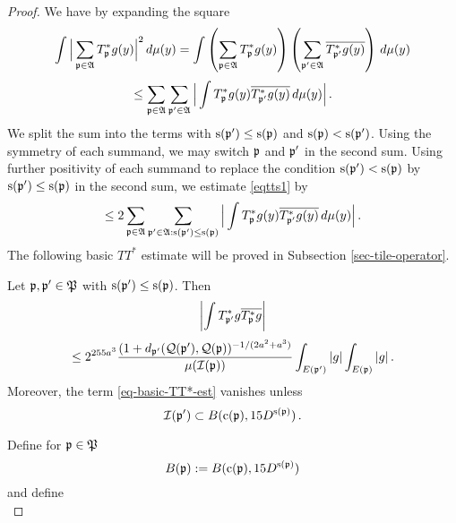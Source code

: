 {\begin{proof}
 We have by expanding the square
\begin{equation}
    \int \Big|\sum_{{\mathfrak p}\in \mathfrak{A}}T^*_{{\mathfrak p}}g(y)\Big|^2\, d\mu(y)=
    \int \left(\sum_{{\mathfrak p}\in \mathfrak{A}} T^*_{{\mathfrak p}}g(y)\right)
    \left(\sum_{{\mathfrak p}'\in \mathfrak{A}}\overline{T^*_{{\mathfrak p}'}g(y)}\right)\, d\mu(y)
\end{equation}\label{eqtts1}
\begin{equation}
    \le \sum_{{\mathfrak p}\in \mathfrak{A}} \sum_{{\mathfrak p}'\in \mathfrak{A}}
    \Big|\int T^*_{{\mathfrak p}}g(y)\overline{T^*_{{\mathfrak p}'}g(y)}\, d\mu(y)\Big|\,.
\end{equation}
We split the sum into the terms with ${\mathrm{s}}({\mathfrak p}')\le {\mathrm{s}}({\mathfrak p})$
and ${\mathrm{s}}({\mathfrak p})< {\mathrm{s}}({\mathfrak p}')$. Using the symmetry of each summand,
we may switch ${\mathfrak p}$ and ${\mathfrak p}'$ in the second sum. Using further positivity
of each summand to replace the condition ${\mathrm{s}}({\mathfrak p}')< {\mathrm{s}}({\mathfrak p})$
by ${\mathrm{s}}({\mathfrak p}')\le  {\mathrm{s}}({\mathfrak p})$ in the second sum, we estimate \eqref{eqtts1} by
\begin{equation}\label{eqtts2}
    \le2 \sum_{{\mathfrak p}\in \mathfrak{A}} \sum_{{\mathfrak p}'\in \mathfrak{A}: {\mathrm{s}}({\mathfrak p}')\le {\mathrm{s}}({\mathfrak p})}
    \Big|\int T^*_{{\mathfrak p}}g(y)\overline{T^*_{{\mathfrak p}'}g(y)}\, d\mu(y)\Big|\,.
\end{equation}
The following basic $TT^*$ estimate will be proved in Subsection \ref{sec-tile-operator}.
\begin{lemma}
    \label{tile-correlation}
    Let ${\mathfrak p}, {\mathfrak p}'\in {\mathfrak P}$ with
    ${\mathrm{s}}({{\mathfrak p}'})\leq {\mathrm{s}}({{\mathfrak p}})$.
    Then
    \begin{equation}
        \label{eq-basic-TT*-est}
        \left|\int T^*_{{\mathfrak p}'}g\overline{T^*_{{\mathfrak p}}g}\right|
    \end{equation}
    \begin{equation}
        \le 2^{255a^3}\frac{(1+d_{{\mathfrak p}'}({\mathcal{Q}}({\mathfrak p}'), {\mathcal{Q}}({\mathfrak p}))^{-1/(2a^2+a^3)}}{\mu({\mathcal{I}}({\mathfrak p}))}\int_{E({\mathfrak p}')}|g|\int_{E({\mathfrak p})}|g|\,.
    \end{equation}
    Moreover, the term   \eqref{eq-basic-TT*-est} vanishes unless
    \begin{equation}
        {\mathcal{I}}({\mathfrak p}') \subset B({\mathrm{c}}({\mathfrak p}), 15D^{{\mathrm{s}}({\mathfrak p})})\, .
    \end{equation}
\end{lemma}
Define for ${\mathfrak p}\in {\mathfrak P}$
\begin{equation}
    B({\mathfrak p}):=B({\mathrm{c}}({\mathfrak p}), 15D^{{\mathrm{s}}({\mathfrak p})})
\end{equation}
and define
\begin{equation}

\end{equation}
\end{proof}}
